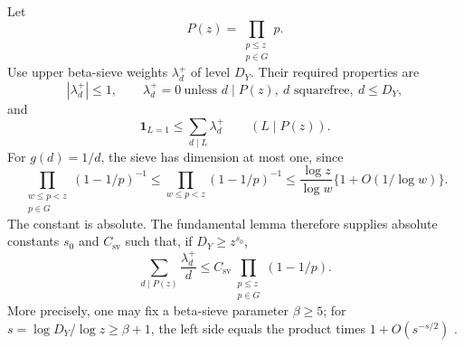 \documentclass[10pt]{amsart}
\numberwithin{equation}{section}
\newcommand{\ind}{\mathbf 1}
\theoremstyle{remark}
\begin{document}
Let
\[
 P(z)=\prod_{\substack{p\le z\\p\in G}}p.
\]
Use upper beta-sieve weights \(\lambda_d^+\) of level \(D_Y\). Their
required properties are
\begin{equation}\label{eq:sieve-support}
 |\lambda_d^+|\le1,\qquad
 \lambda_d^+=0\ \text{unless }d\mid P(z),\ d\text{ squarefree},\ d\le D_Y,
\end{equation}
and
\begin{equation}\label{eq:sieve-majorant}
 \ind_{L=1}\le\sum_{d\mid L}\lambda_d^+
 \qquad(L\mid P(z)).
\end{equation}
For \(g(d)=1/d\), the sieve has dimension at most one, since
\begin{equation}\label{eq:sieve-dimension}
 \prod_{\substack{w\le p<z\\p\in G}}(1-1/p)^{-1}
 \le
 \prod_{w\le p<z}(1-1/p)^{-1}
 \le
 \frac{\log z}{\log w}\{1+O(1/\log w)\}.
\end{equation}
The constant is absolute. The fundamental lemma
\cite[Lemma 6.11]{FriedlanderIwaniec} therefore supplies absolute constants
\(s_0\) and \(C_{\mathrm{sv}}\) such that, if \(D_Y\ge z^{s_0}\),
\begin{equation}\label{eq:fundamental-lemma}
 \sum_{d\mid P(z)}\frac{\lambda_d^+}{d}
 \le C_{\mathrm{sv}}
 \prod_{\substack{p\le z\\p\in G}}(1-1/p).
\end{equation}
More precisely, one may fix a beta-sieve parameter \(\beta\ge5\); for
\(s=\log D_Y/\log z\ge\beta+1\), the left side equals the product times
\(1+O(s^{-s/2})\) \cite[Theorem 2.2]{KurlbergEtAl}.
\end{document}
